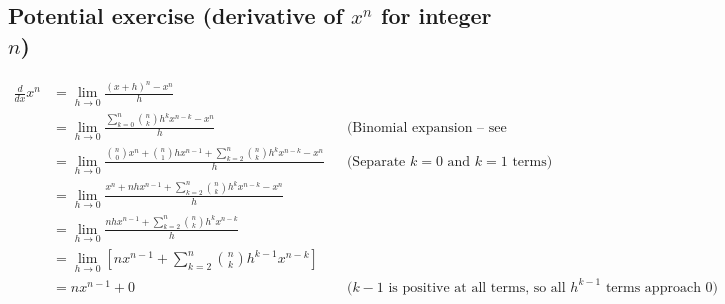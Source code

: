 \subsection{Potential exercise (derivative of $x^n$ for integer $n$)}

\begin{align*}
\frac{d}{dx}x^n &= \lim_{h \rightarrow 0} \frac{(x+h)^n - x^n}{h} \\
&= \lim_{h \rightarrow 0} \frac{\sum_{k=0}^n \binom{n}{k}h^k x^{n-k} - x^n}{h} && \text{(Binomial expansion -- see chapter)} \\
&= \lim_{h \rightarrow 0} \frac{\binom{n}{0}x^n + \binom{n}{1}hx^{n-1} + \sum_{k=2}^n \binom{n}{k}h^k x^{n-k} - x^n}{h} && \text{(Separate $k=0$ and $k=1$ terms)} \\
&= \lim_{h \rightarrow 0} \frac{x^n + nhx^{n-1} + \sum_{k=2}^n \binom{n}{k}h^k x^{n-k} - x^n}{h} \\
&= \lim_{h \rightarrow 0} \frac{nhx^{n-1} + \sum_{k=2}^n \binom{n}{k}h^k x^{n-k}}{h} \\
&= \lim_{h \rightarrow 0} \left[nx^{n-1} + \sum_{k=2}^n \binom{n}{k}h^{k-1} x^{n-k}\right] \\
&= nx^{n-1} + 0 && \text{($k-1$ is positive at all terms, so all $h^{k-1}$ terms approach 0)}\\
\end{align*}
